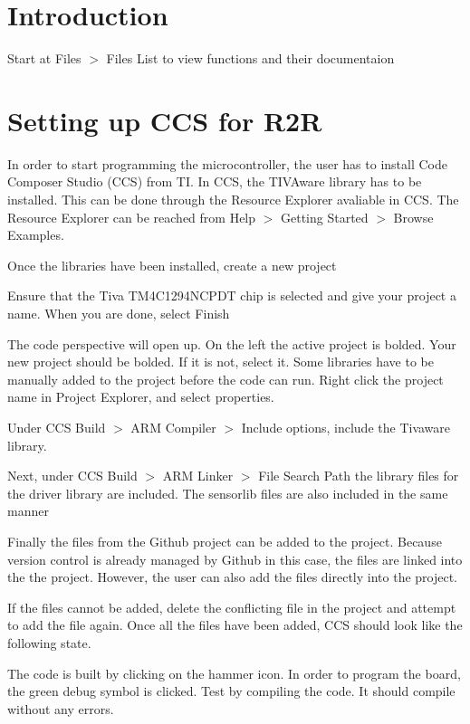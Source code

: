 \hypertarget{index_intro_sec}{}\section{Introduction}\label{index_intro_sec}
Start at {\ttfamily Files $>$ Files List} to view functions and their documentaion\hypertarget{index_setup}{}\section{Setting up C\+C\+S for R2R}\label{index_setup}
In order to start programming the microcontroller, the user has to install Code Composer Studio (C\+CS) from TI. In C\+CS, the T\+I\+V\+Aware library has to be installed. This can be done through the Resource Explorer avaliable in C\+CS. The Resource Explorer can be reached from Help $>$ Getting Started $>$ Browse Examples.

 Once the libraries have been installed, create a new project

 Ensure that the Tiva T\+M4\+C1294\+N\+C\+P\+DT chip is selected and give your project a name. When you are done, select Finish

 The code perspective will open up. On the left the active project is bolded. Your new project should be bolded. If it is not, select it. Some libraries have to be manually added to the project before the code can run. Right click the project name in Project Explorer, and select properties.

Under C\+CS Build $>$ A\+RM Compiler $>$ Include options, include the Tivaware library.

 Next, under C\+CS Build $>$ A\+RM Linker $>$ File Search Path the library files for the driver library are included. The sensorlib files are also included in the same manner

 Finally the files from the Github project can be added to the project. Because version control is already managed by Github in this case, the files are linked into the the project. However, the user can also add the files directly into the project.

 If the files cannot be added, delete the conflicting file in the project and attempt to add the file again. Once all the files have been added, C\+CS should look like the following state.

 The code is built by clicking on the hammer icon. In order to program the board, the green debug symbol is clicked. Test by compiling the code. It should compile without any errors.

